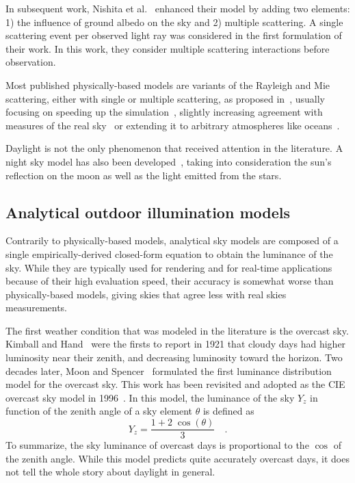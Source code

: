 In subsequent work, Nishita et al.~\cite{nishita1996display} enhanced their model by adding two elements: 1) the influence of ground albedo on the sky and 2) multiple scattering. A single scattering event per observed light ray was considered in the first formulation of their work. In this work, they consider multiple scattering interactions before observation.

Most published physically-based models are variants of the Rayleigh and Mie scattering, either with single or multiple scattering, as proposed in~\cite{nishita1993display,nishita1996display}, usually focusing on speeding up the simulation~\cite{oneal2005accurate}, slightly increasing agreement with measures of the real sky~\cite{haber2005physically,bruneton2008precomputed} or extending it to arbitrary atmospheres like oceans~\cite{elek2010real}.

Daylight is not the only phenomenon that received attention in the literature. A night sky model has also been developed~\cite{jensen2001nightskymodel}, taking into consideration the sun's reflection on the moon as well as the light emitted from the stars.

\subsection{Analytical outdoor illumination models}

Contrarily to physically-based models, analytical sky models are composed of a single empirically-derived closed-form equation to obtain the luminance of the sky. While they are typically used for rendering and for real-time applications because of their high evaluation speed, their accuracy is somewhat worse than physically-based models, giving skies that agree less with real skies measurements.

The first weather condition that was modeled in the literature is the overcast sky. Kimball and Hand~\cite{kimball1921sky} were the firsts to report in 1921 that cloudy days had higher luminosity near their zenith, and decreasing luminosity toward the horizon. Two decades later, Moon and Spencer~\cite{moon1942illumination} formulated the first luminance distribution model for the overcast sky. This work has been revisited and adopted as the CIE overcast sky model in 1996~\cite{cie1996s}. In this model, the luminance of the sky $Y_z$ in function of the zenith angle of a sky element $\theta$ is defined as
\begin{equation}
Y_z = \frac{1 + 2 \; \cos\left( \theta \right)}{3} \quad.
\end{equation}
To summarize, the sky luminance of overcast days is proportional to the $\cos$ of the zenith angle. While this model predicts quite accurately overcast days, it does not tell the whole story about daylight in general.

